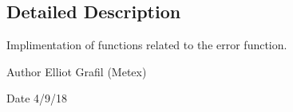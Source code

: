 \subsection{Detailed Description}
Implimentation of functions related to the error function. 

\begin{DoxyAuthor}{Author}
Elliot Grafil (Metex) 
\end{DoxyAuthor}
\begin{DoxyDate}{Date}
4/9/18 
\end{DoxyDate}
